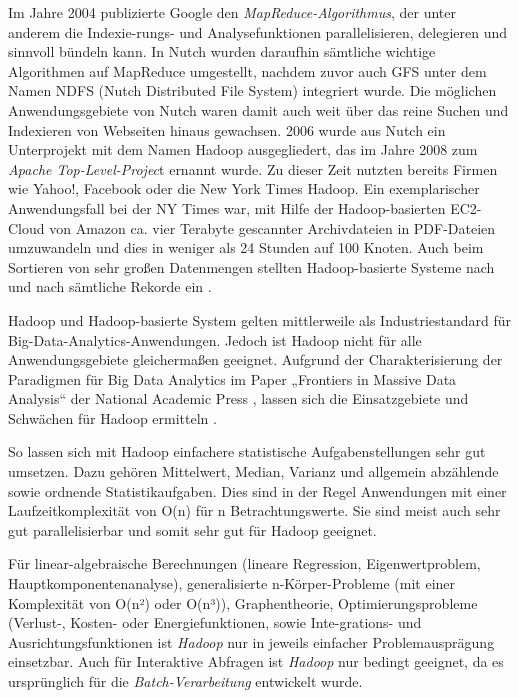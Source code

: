 Im Jahre 2004 publizierte Google den \textit{MapReduce-Algorithmus}, der unter anderem die Indexie-rungs- und Analysefunktionen parallelisieren, delegieren und sinnvoll bündeln kann. In Nutch wurden daraufhin sämtliche wichtige Algorithmen auf MapReduce umgestellt, nachdem zuvor auch GFS unter dem Namen NDFS (Nutch Distributed File System) integriert wurde. Die möglichen Anwendungsgebiete von Nutch waren damit auch weit über das reine Suchen und Indexieren von Webseiten hinaus gewachsen. 2006 wurde aus Nutch ein Unterprojekt mit dem Namen Hadoop ausgegliedert, das im Jahre 2008 zum \textit{Apache Top-Level-Projec}t ernannt wurde. Zu dieser Zeit nutzten bereits Firmen wie Yahoo!, Facebook oder die New York Times Hadoop. Ein exemplarischer Anwendungsfall bei der NY Times war, mit Hilfe der Hadoop-basierten EC2-Cloud von Amazon ca. vier Terabyte gescannter Archivdateien in PDF-Dateien umzuwandeln und dies in weniger als 24 Stunden auf 100 Knoten. Auch beim Sortieren von sehr großen Datenmengen stellten Hadoop-basierte Systeme nach und nach sämtliche Rekorde ein . 

Hadoop und Hadoop-basierte System gelten mittlerweile als Industriestandard für Big-Data-Analytics-Anwendungen. Jedoch ist Hadoop nicht für alle Anwendungsgebiete gleichermaßen geeignet. Aufgrund der Charakterisierung der Paradigmen für Big Data Analytics im Paper „Frontiers in Massive Data Analysis“ der National Academic Press , lassen sich die Einsatzgebiete und Schwächen für Hadoop ermitteln .

So lassen sich mit Hadoop einfachere statistische Aufgabenstellungen sehr gut umsetzen. Dazu gehören Mittelwert, Median, Varianz und allgemein abzählende sowie ordnende Statistikaufgaben. Dies sind in der Regel Anwendungen mit einer Laufzeitkomplexität von O(n) für n Betrachtungswerte. Sie sind meist auch sehr gut parallelisierbar und somit sehr gut für Hadoop geeignet.    



Für linear-algebraische Berechnungen (lineare Regression, Eigenwertproblem, Hauptkomponentenanalyse), generalisierte n-Körper-Probleme (mit einer Komplexität 
von O(n²) oder O(n³)), Graphentheorie, Optimierungsprobleme (Verlust-, Kosten- oder Energiefunktionen, sowie  Inte-grations- und Ausrichtungsfunktionen ist \textit{Hadoop} nur in jeweils einfacher Problemausprägung einsetzbar. Auch für Interaktive Abfragen ist \textit{Hadoop} nur bedingt geeignet, da es ursprünglich für die \textit{Batch-Verarbeitung} entwickelt wurde.

